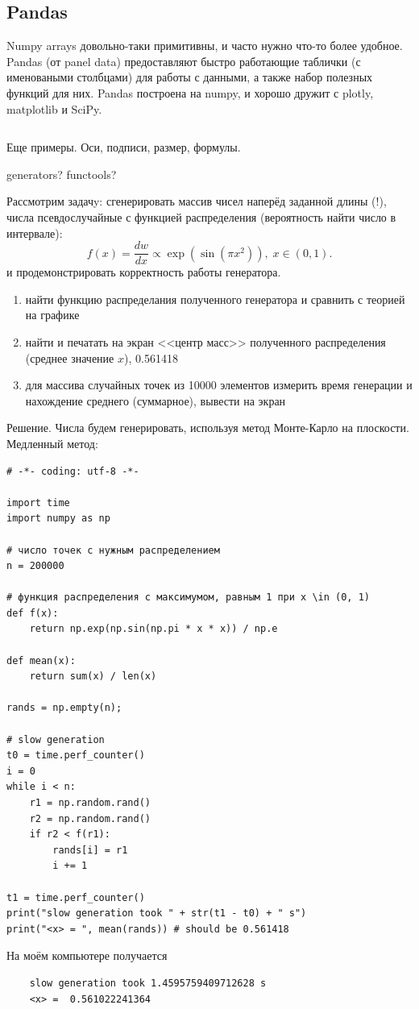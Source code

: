 \documentclass{book}
\begin{document}
\subsection{Pandas}

Numpy arrays довольно-таки примитивны, и часто нужно что-то более удобное. Pandas (от panel data) предоставляют быстро работающие таблички
(с именоваными столбцами) для работы с данными, а также набор полезных функций для них. Pandas построена на numpy, и хорошо дружит с plotly,
matplotlib и SciPy.

\inputminted{python}{pandas_tutorial.py}

Еще примеры. Оси, подписи, размер, формулы.

generators?
functools?

Рассмотрим
задачy: сгенерировать массив чисел наперёд заданной длины (!), числа псевдослучайные
с функцией распределения (вероятность найти число в интервале):
\begin{equation}
    f(x) = \frac{dw}{dx} \propto \exp(\sin(\pi x^2)),\; x \in (0, 1).
\end{equation}
и продемонстрировать корректность работы генератора.
\begin{enumerate}
  \item найти функцию распределания полученного генератора и сравнить с теорией
      на графике %
  \item найти и печатать на экран <<центр масс>> полученного
      распределения (среднее значение $x$), 0.561418%
  \item для массива случайных точек из 10000 элементов измерить время генерации
      и нахождение среднего (суммарное), вывести на экран %
\end{enumerate}

Решение. Числа будем генерировать, используя метод Монте-Карло на плоскости. Медленный метод:
\begin{verbatim}
# -*- coding: utf-8 -*-

import time
import numpy as np

# число точек с нужным распределением
n = 200000

# функция распределения с максимумом, равным 1 при x \in (0, 1)
def f(x):
    return np.exp(np.sin(np.pi * x * x)) / np.e

def mean(x):
    return sum(x) / len(x)

rands = np.empty(n);

# slow generation
t0 = time.perf_counter()
i = 0
while i < n:
    r1 = np.random.rand()
    r2 = np.random.rand()
    if r2 < f(r1):
        rands[i] = r1
        i += 1

t1 = time.perf_counter()
print("slow generation took " + str(t1 - t0) + " s")
print("<x> = ", mean(rands)) # should be 0.561418
\end{verbatim}
На моём компьютере получается
\begin{verbatim}
    slow generation took 1.4595759409712628 s
    <x> =  0.561022241364
\end{verbatim}
\end{document}
